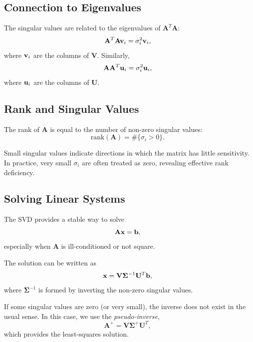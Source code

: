 \subsection*{Connection to Eigenvalues}

The singular values are related to the eigenvalues of $\mathbf{A}^T \mathbf{A}$:
\begin{equation}
    \mathbf{A}^T \mathbf{A} \vb{v}_i = \sigma_i^2 \vb{v}_i,
\end{equation}
where $\vb{v}_i$ are the columns of $\mathbf{V}$. Similarly,
\begin{equation}
    \mathbf{A} \mathbf{A}^T \vb{u}_i = \sigma_i^2 \vb{u}_i,
\end{equation}
where $\vb{u}_i$ are the columns of $\mathbf{U}$.

\subsection*{Rank and Singular Values}

The rank of $\mathbf{A}$ is equal to the number of non-zero singular values:
\begin{equation}
    \mathrm{rank}(\mathbf{A}) = \# \{ \sigma_i > 0 \}.
\end{equation}

Small singular values indicate directions in which the matrix has little
sensitivity. In practice, very small $\sigma_i$ are often treated as zero,
revealing effective rank deficiency.

\subsection*{Solving Linear Systems}

The SVD provides a stable way to solve
\begin{equation}
    \mathbf{A} \vb{x} = \vb{b},
\end{equation}
especially when $\mathbf{A}$ is ill-conditioned or not square.

The solution can be written as
\begin{equation}
    \vb{x} = \mathbf{V} \boldsymbol{\Sigma}^{-1} \mathbf{U}^T \vb{b},
\end{equation}
where $\boldsymbol{\Sigma}^{-1}$ is formed by inverting the non-zero singular
values.

If some singular values are zero (or very small), the inverse does not exist in
the usual sense. In this case, we use the \emph{pseudo-inverse},
\begin{equation}
    \mathbf{A}^{+} = \mathbf{V} \boldsymbol{\Sigma}^{+} \mathbf{U}^T,
\end{equation}
which provides the least-squares solution.

